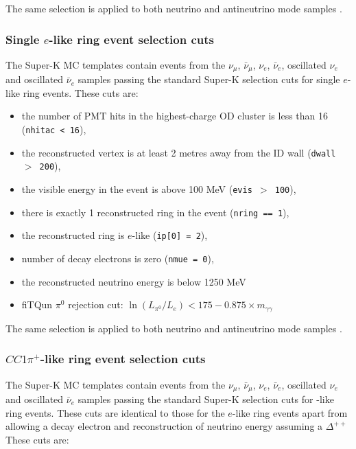 The same selection is applied to both neutrino and antineutrino mode samples \cite{Superk_run7}.



\subsubsection {Single $e$-like ring event selection cuts}
\label{sec:mc_templates:1Re_cuts}

The Super-K MC templates contain events from the 
$\nu_{\mu}$, $\bar{\nu}_{\mu}$, $\nu_{e}$, $\bar{\nu}_{e}$, oscillated $\nu_{e}$ and oscillated $\bar{\nu}_{e}$ 
 samples passing the standard Super-K selection cuts for single $e$-like ring events.
These cuts are:

\begin{itemize}
\item
the number of PMT hits in the highest-charge OD cluster is less than 16
({\tt nhitac < 16}), 
\item
the reconstructed vertex is at least 2 metres away from the ID wall 
({\tt dwall $>$ 200}),
\item
the visible energy in the event is above 100 MeV 
({\tt evis  $>$ 100}),
\item
there is exactly 1 reconstructed ring in the event 
({\tt nring == 1}),
\item
the reconstructed ring is $e$-like 
({\tt ip[0] = 2}),
\item
number of decay electrons is zero
({\tt nmue = 0}),
\item
the reconstructed neutrino energy is below 1250 MeV
\item
fiTQun $\pi^0$ rejection cut: $\ln (L_{\pi^0} / L_e ) < 175 - 0.875 \times m_{\gamma \gamma} $
\end{itemize}

The same selection is applied to both neutrino and antineutrino mode samples \cite{Superk_run7}.


\subsubsection {$CC1\pi^{+}$-like ring event selection cuts}
\label{sec:mc_templates:nueCC1pi_cuts}

The Super-K MC templates contain events from the 
$\nu_{\mu}$, $\bar{\nu}_{\mu}$, $\nu_{e}$, $\bar{\nu}_{e}$, oscillated $\nu_{e}$ and oscillated $\bar{\nu}_{e}$ 
 samples passing the standard Super-K selection cuts for \nueCConepi{}-like ring events. These cuts are identical to those for the $e$-like ring events apart from allowing a decay electron and reconstruction of neutrino energy assuming a \( \Delta^{++} \)
These cuts are:

